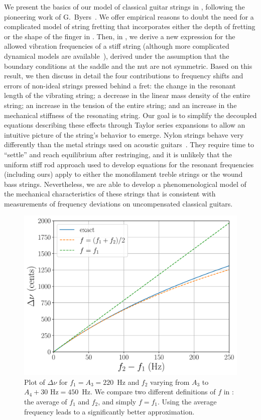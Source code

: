 We present the basics of our model of classical guitar strings in , following the pioneering work of G.\ Byers~\cite{ref:byers1996cgi,ref:byersweb}. We offer empirical reasons to doubt the need for a complicated model of string fretting that incorporates either the depth of fretting or the shape of the finger in . Then, in , we derive a new expression for the allowed vibration frequencies of a stiff string (although more complicated dynamical models are available~\cite{ref:ducceschi2016lss}), derived  under the assumption that the boundary conditions at the saddle and the nut are not symmetric. Based on this result, we then discuss in detail the four contributions to frequency shifts and errors of non-ideal strings pressed behind a fret: the change in the resonant length of the vibrating string; a decrease in the linear mass density of the entire string; an increase in the tension of the entire string; and an increase in the mechanical stiffness of the resonating string. Our goal is to simplify the decoupled equations describing these effects through Taylor series expansions to allow an intuitive picture of the string's behavior to emerge. Nylon strings behave very differently than the metal strings used on acoustic guitars~\cite{ref:lynchaird2017mpn,ref:lynchaird2018cmp}. They require time to ``settle'' and reach equilibrium after restringing, and it is unlikely that the uniform stiff rod approach used to develop equations for the resonant frequencies (including ours) apply to either the monofilament treble strings or the wound bass strings. Nevertheless, we are able to develop a phenomenological model of the mechanical characteristics of these strings that is consistent with measurements of frequency deviations on uncompensated classical guitars.

\begin{figure}
    \centering
    \includegraphics[width=6.5in]{figures/diff_pitch}
    \caption{\label{fig:diff_pitch} Plot of $\Delta \nu$ for $f_1 = A_3 = 220$~Hz and $f_2$ varying from $A_3$ to $A_4 + 30 \textrm{ Hz} = 450$~Hz. We compare two different definitions of $f$ in : the average of $f_1$ and $f_2$, and simply $f = f_1$. Using the average frequency leads to a significantly better approximation.}
\end{figure}

